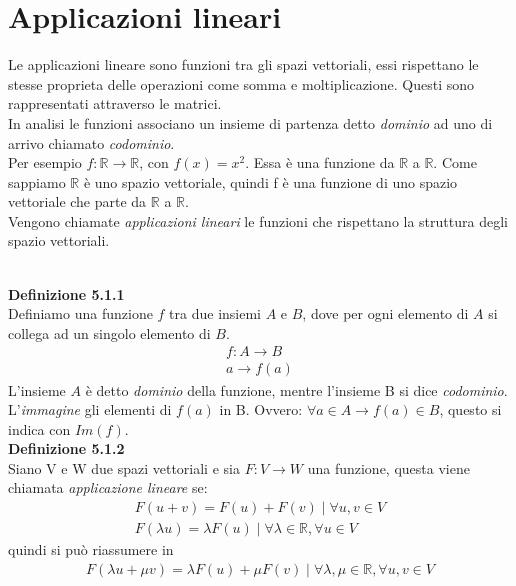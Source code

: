 \documentclass{article}
\begin{document}
\pagebreak
\section{Applicazioni lineari}
Le applicazioni lineare sono funzioni tra gli spazi vettoriali, essi rispettano le stesse proprieta delle operazioni come somma e moltiplicazione. Questi sono rappresentati attraverso le matrici.
\\ In analisi le funzioni associano un insieme di partenza  detto \textit{dominio} ad uno di arrivo chiamato \textit{codominio}.
\\ Per esempio $f : \mathbb{R} \to \mathbb{R}$, con $f(x)=x^2$. Essa è una funzione da $\mathbb{R}$ a $\mathbb{R}$. Come sappiamo $\mathbb{R}$ è uno spazio vettoriale, quindi f è una funzione di uno spazio vettoriale che parte da $\mathbb{R}$ a $\mathbb{R}$.
\\ Vengono chiamate \textit{applicazioni lineari} le funzioni  che rispettano la struttura degli spazio vettoriali.

\vspace{5px}
\textbf{\\Definizione 5.1.1}
\\Definiamo una funzione $f$ tra due insiemi $A$ e $B$, dove per ogni elemento di $A$ si collega ad un singolo elemento di $B$.
\begin{align*}
  f : A \to B \\
   a \to f(a)
\end{align*}
L'insieme $A$ è detto \textit{dominio} della funzione, mentre l'insieme B si dice \textit{codominio}.
\\L'\textit{immagine} gli elementi di $f(a)$ in B. Ovvero:  $\forall a \in A \to f(a) \in B$, questo si indica con $Im(f)$.
\vspace{5px}
\textbf{\\Definizione 5.1.2}
\\ Siano V e W due spazi vettoriali e sia $F : V \to W$ una funzione, questa viene chiamata \textit{applicazione lineare} se:
\begin{align}
  F(u+v)=F(u)+F(v) \mid \forall u,v \in V \\
  F(\lambda u)=\lambda F(u) \mid \forall \lambda \in \mathbb{R}, \forall u \in V
\end{align}
quindi si può riassumere in
\begin{align*}
  F(\lambda u + \mu v)= \lambda F(u)+ \mu F(v) \mid \forall \lambda,\mu \in \mathbb{R}, \forall u,v \in V
\end{align*}
\end{document}
